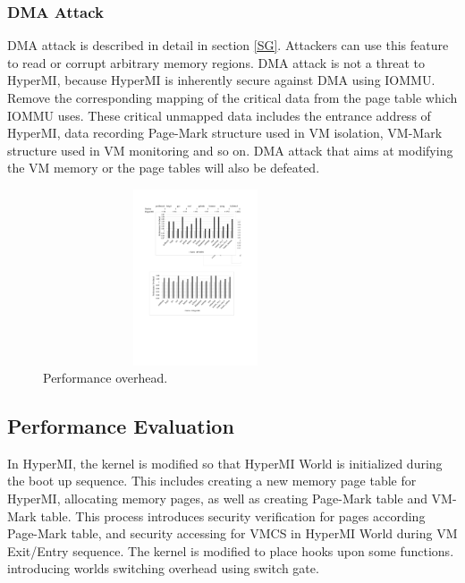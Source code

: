 \documentclass[conference]{IEEEtran}
\begin{document}
\subsubsection{DMA Attack}

 DMA attack is described in detail in section \ref{SG}. Attackers can use this feature to read or corrupt arbitrary memory regions. DMA attack is not a threat to HyperMI, because HyperMI is inherently secure against DMA using IOMMU. Remove the corresponding mapping of the critical data from the page table which IOMMU uses. These critical unmapped data includes the entrance address of HyperMI, data recording Page-Mark structure used in VM isolation, VM-Mark structure used in VM monitoring and so on. DMA attack that aims at modifying the VM memory or the page tables will also be defeated.

\begin{figure}
\centerline{\includegraphics[width=9cm,height=5.2cm]{performance.pdf}}
\caption{Performance overhead.} \label{fig5}
\end{figure}

\subsection{Performance Evaluation}

In HyperMI, the kernel is modified so that HyperMI World is initialized during the boot up sequence. This includes creating a new memory page table for HyperMI, allocating memory pages, as well as creating Page-Mark table and VM-Mark table. This process introduces security verification for pages according Page-Mark table, and security accessing for VMCS in HyperMI World during VM Exit/Entry sequence.
The kernel is modified to place hooks upon some functions.
introducing worlds switching overhead using switch gate.
\end{document}
